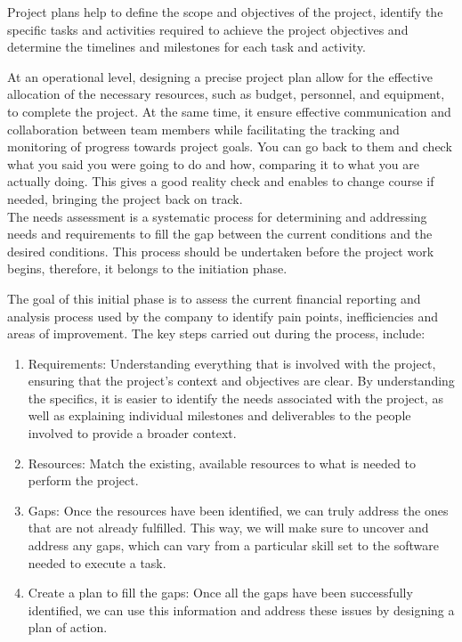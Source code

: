 \documentclass[12pt,a4paper,openright,twoside]{book}
\begin{document}
Project plans help to define the scope and objectives of the project, identify the specific tasks and activities required to achieve the project objectives and determine the timelines and milestones for each task and activity.

At an operational level, designing a precise project plan allow for the effective allocation of the necessary resources, such as budget, personnel, and equipment, to complete the project.
%
At the same time, it ensure effective communication and collaboration between team members while facilitating the tracking and monitoring of progress towards project goals.
%
You can go back to them and check what you said you were going to do and how, comparing it to what you are actually doing. This gives a good reality check and enables to change course if needed, bringing the project back on track. \\

The needs assessment is a systematic process for determining and addressing needs and requirements to fill the gap between the current conditions and the desired conditions.
%
This process should be undertaken before the project work begins, therefore, it belongs to the initiation phase.

The goal of this initial phase is to assess the current financial reporting and analysis process used by the company to identify pain points, inefficiencies and areas of improvement.
%
The key steps carried out during the process, include:

\begin{enumerate}
    \item Requirements: Understanding everything that is involved with the project, ensuring that the project’s context and objectives are clear. By understanding the specifics, it is easier to identify the needs associated with the project, as well as explaining individual milestones and deliverables to the people involved to provide a broader context.
    \item Resources: Match the existing, available resources to what is needed to perform the project. 
    \item Gaps: Once the resources have been identified, we can truly address the ones that are not already fulfilled. This way, we will make sure to uncover and address any gaps, which can vary from a particular skill set to the software needed to execute a task. 
    \item Create a plan to fill the gaps: Once all the gaps have been successfully identified, we can use this information and address these issues by designing a plan of action. 
\end{enumerate}
\end{document}
